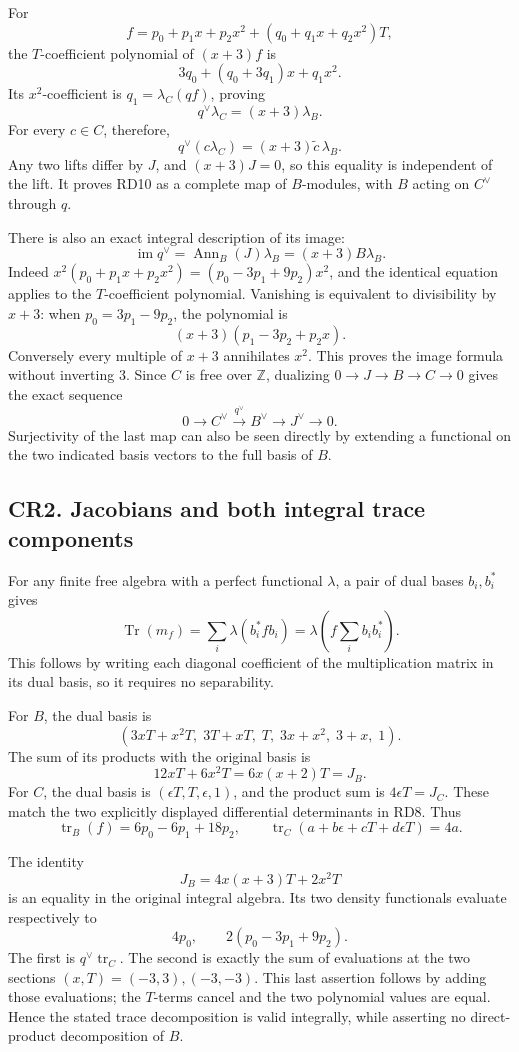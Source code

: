 \documentclass[
]{article}
\begin{document}
For \[
f=p_0+p_1x+p_2x^2+(q_0+q_1x+q_2x^2)T,
\] the \(T\)-coefficient polynomial of \((x+3)f\) is \[
3q_0+(q_0+3q_1)x+q_1x^2.
\] Its \(x^2\)-coefficient is \(q_1=\lambda_C(qf)\), proving \[
q^\vee\lambda_C=(x+3)\lambda_B.
\] For every \(c\in C\), therefore, \[
q^\vee(c\lambda_C)=(x+3)\widetilde c\,\lambda_B.
\] Any two lifts differ by \(J\), and \((x+3)J=0\), so this equality is
independent of the lift. It proves RD10 as a complete map of
\(B\)-modules, with \(B\) acting on \(C^\vee\) through \(q\).

There is also an exact integral description of its image: \[
\operatorname{im}q^\vee=\operatorname{Ann}_B(J)\lambda_B=(x+3)B\lambda_B.
\] Indeed \(x^2(p_0+p_1x+p_2x^2)=(p_0-3p_1+9p_2)x^2\), and the identical
equation applies to the \(T\)-coefficient polynomial. Vanishing is
equivalent to divisibility by \(x+3\): when \(p_0=3p_1-9p_2\), the
polynomial is \[
(x+3)(p_1-3p_2+p_2x).
\] Conversely every multiple of \(x+3\) annihilates \(x^2\). This proves
the image formula without inverting 3. Since \(C\) is free over
\(\mathbb Z\), dualizing \(0\to J\to B\to C\to0\) gives the exact
sequence \[
0\to C^\vee\xrightarrow{q^\vee}B^\vee\to J^\vee\to0.
\] Surjectivity of the last map can also be seen directly by extending a
functional on the two indicated basis vectors to the full basis of
\(B\).

\subsection{CR2. Jacobians and both integral trace
components}\label{cr2.-jacobians-and-both-integral-trace-components}

For any finite free algebra with a perfect functional \(\lambda\), a
pair of dual bases \(b_i,b_i^*\) gives \[
\operatorname{Tr}(m_f)=\sum_i\lambda(b_i^*fb_i)
=\lambda\!\left(f\sum_i b_i b_i^*\right).
\] This follows by writing each diagonal coefficient of the
multiplication matrix in its dual basis, so it requires no separability.

For \(B\), the dual basis is \[
(3xT+x^2T,\;3T+xT,\;T,\;3x+x^2,\;3+x,\;1).
\] The sum of its products with the original basis is \[
12xT+6x^2T=6x(x+2)T=J_B.
\] For \(C\), the dual basis is \((\epsilon T,T,\epsilon,1)\), and the
product sum is \(4\epsilon T=J_C\). These match the two explicitly
displayed differential determinants in RD8. Thus \[
\operatorname{tr}_B(f)=6p_0-6p_1+18p_2,\qquad
\operatorname{tr}_C(a+b\epsilon+cT+d\epsilon T)=4a.
\]

The identity \[
J_B=4x(x+3)T+2x^2T
\] is an equality in the original integral algebra. Its two density
functionals evaluate respectively to \[
4p_0,\qquad 2(p_0-3p_1+9p_2).
\] The first is \(q^\vee\operatorname{tr}_C\). The second is exactly the
sum of evaluations at the two sections \((x,T)=(-3,3),(-3,-3)\). This
last assertion follows by adding those evaluations; the \(T\)-terms
cancel and the two polynomial values are equal. Hence the stated trace
decomposition is valid integrally, while asserting no direct-product
decomposition of \(B\).
\end{document}
